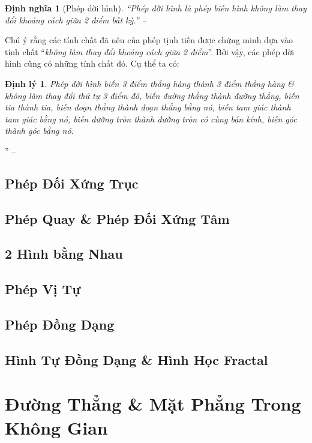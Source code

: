 \documentclass[oneside]{book}
\numberwithin{equation}{section}
\newtheorem{dinhnghia}{Định nghĩa}[section]
\newtheorem{dinhly}{Định lý}[section]
\begin{document}
\begin{dinhnghia}[Phép dời hình]
	``\emph{Phép dời hình} là phép biến hình không làm thay đổi khoảng cách giữa 2 điểm bất kỳ.'' -- \cite[p. 8]{SGK_Toan_11_hinh_hoc_nang_cao}
\end{dinhnghia}
Chú ý rằng các tính chất đã nêu của phép tịnh tiến được chứng minh dựa vào tính chất ``\textit{không làm thay đổi khoảng cách giữa 2 điểm}''. Bởi vậy, các phép dời hình cũng có những tính chất đó. Cụ thể ta có:

\begin{dinhly}
	Phép dời hình biến 3 điểm thẳng hàng thành 3 điểm thẳng hàng \& không làm thay đổi thứ tự 3 điểm đó, biến đường thằng thành đường thẳng, biến tia thành tia, biến đoạn thẳng thành đoạn thẳng bằng nó, biến tam giác thành tam giác bằng nó, biến đường tròn thành đường tròn có cùng bán kính, biến góc thành góc bằng nó.
\end{dinhly}
'' -- \cite[p. 8]{SGK_Toan_11_hinh_hoc_nang_cao}

\section{Phép Đối Xứng Trục}

\section{Phép Quay \& Phép Đối Xứng Tâm}

\section{2 Hình bằng Nhau}

\section{Phép Vị Tự}

\section{Phép Đồng Dạng}

\section{Hình Tự Đồng Dạng \& Hình Học Fractal}


\chapter{Đường Thẳng \& Mặt Phẳng Trong Không Gian}
\end{document}
